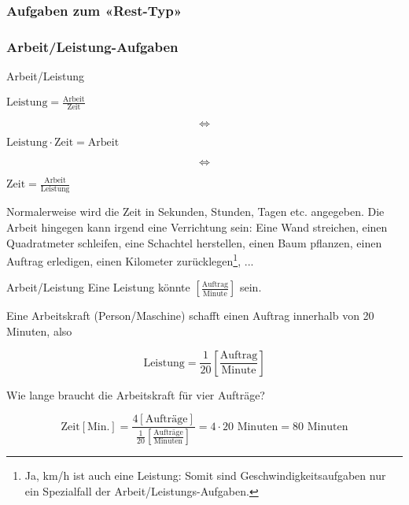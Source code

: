 
  \subsubsection*{Aufgaben zum «Rest-Typ»}

\newpage

\subsubsection{Arbeit/Leistung-Aufgaben}

\begin{gesetz}{Arbeit/Leistung}{}
  \begin{center}
    $\text{Leistung} = \frac{\mathrm{Arbeit}}{\mathrm{Zeit}}$
  \end{center}
  
  $$\Longleftrightarrow$$
  \begin{center}
    $\mathrm{Leistung} \cdot{} \text{Zeit} = \text{Arbeit}$
  \end{center}

  $$\Longleftrightarrow$$
  \begin{center}
    $\text{Zeit} = \frac{\mathrm{Arbeit}}{\mathrm{Leistung}}$
  \end{center}
 
\end{gesetz}

Normalerweise wird die Zeit in Sekunden, Stunden, Tagen etc. angegeben. Die
Arbeit hingegen kann irgend eine Verrichtung sein: Eine Wand
streichen, einen Quadratmeter schleifen, eine Schachtel herstellen,
einen Baum pflanzen, einen Auftrag erledigen, einen Kilometer zurücklegen\footnote{Ja, km/h ist auch eine Leistung: Somit sind Geschwindigkeitsaufgaben nur ein Spezialfall der Arbeit/Leistungs-Aufgaben.}, ...

\begin{beispiel}{Arbeit/Leistung}{}
  Eine Leistung könnte  $\left[\frac{\text{Auftrag}}{\text{Minute}}\right]$ sein.

  Eine Arbeitskraft (Person/Maschine) schafft einen Auftrag innerhalb von 20 Minuten, also

  $$\text{Leistung} = \frac1{20} \left[\frac{\text{Auftrag}}{\text{Minute}}\right]$$

  Wie lange braucht die Arbeitskraft für vier Aufträge?

  $$\text{Zeit} [\text{Min.}] = \frac{4[\text{Aufträge}]}{\frac{1}{20} \left[\frac{\text{Aufträge}}{\text{Minuten}}\right]} = 4\cdot{} 20 \text{ Minuten} = 80 \text{ Minuten}$$
\end{beispiel}


